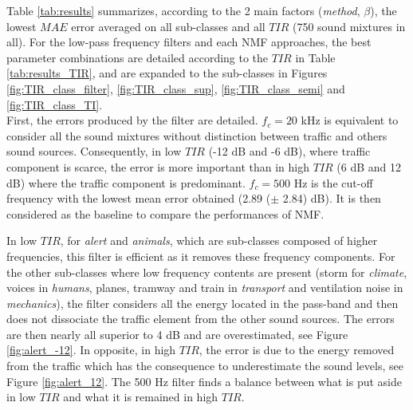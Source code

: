 \documentclass[twocolumn,a4paper,10pt]{article}
\begin{document}
Table \ref{tab:results} summarizes, according to the 2 main factors (\textit{method}, $\beta$), the lowest $MAE$ error averaged on all sub-classes and all $TIR$ (750 sound mixtures in all). For the low-pass frequency filters and each NMF approaches, the best parameter combinations are detailed according to the $TIR$ in Table \ref{tab:results_TIR},  and are expanded to the sub-classes in Figures \ref{fig:TIR_class_filter}, \ref{fig:TIR_class_sup}, \ref{fig:TIR_class_semi} and \ref{fig:TIR_class_TI}. \\

First, the errors produced by the filter are detailed. $f_c = 20 $ kHz is equivalent to consider all the sound mixtures without distinction between traffic and others sound sources. Consequently, in low $TIR$ (-12 dB and -6 dB), where traffic component is scarce, the error is more important than in high $TIR$ (6 dB and 12 dB) where the traffic component is predominant. $f_c = 500$ Hz is the cut-off frequency with the lowest mean error obtained (2.89 ($\pm$ 2.84) dB). It is then considered as the baseline to compare the performances of NMF.

In low $TIR$, for \textit{alert} and \textit{animals}, which are sub-classes composed of higher frequencies, this filter is efficient as it removes these frequency components. For the other sub-classes where low frequency contents are present (storm for \textit{climate}, voices in \textit{humans}, planes, tramway and train in \textit{transport} and ventilation noise in \textit{mechanics}), the filter considers all the energy located in the pass-band and then does not dissociate the traffic element from the other sound sources. The errors are then nearly all superior to 4 dB and are overestimated, see Figure \ref{fig:alert_-12}. In opposite, in high $TIR$, the error is due to the energy removed from the traffic which has the consequence to underestimate the sound levels, see Figure \ref{fig:alert_12}. The 500 Hz filter finds a balance between what is put aside in low $TIR$ and what it is remained in high $TIR$. \\
\end{document}
